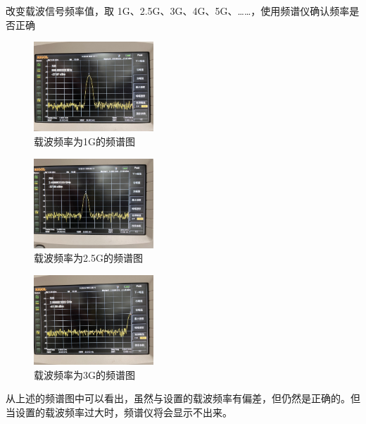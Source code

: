 \documentclass{../source/Experiment}
\begin{document}
改变载波信号频率值，取 1G、2.5G、3G、4G、5G、……，使用频谱仪确认频率是 否正确
\begin{figure}[H]
    \centering
    \includegraphics[width = 0.4\textwidth,angle=180]{lab9/1.jpg}
    \caption{载波频率为1G的频谱图}
\end{figure}

\begin{figure}[H]
    \centering
    \includegraphics[width = 0.4\textwidth,angle=180]{lab9/2.jpg}
    \caption{载波频率为2.5G的频谱图}
\end{figure}
\begin{figure}[H]
    \centering
    \includegraphics[width = 0.4\textwidth,angle=180]{lab9/3.jpg}
    \caption{载波频率为3G的频谱图}
\end{figure}

从上述的频谱图中可以看出，虽然与设置的载波频率有偏差，但仍然是正确的。但当设置的载波频率过大时，频谱仪将会显示不出来。
\end{document}
